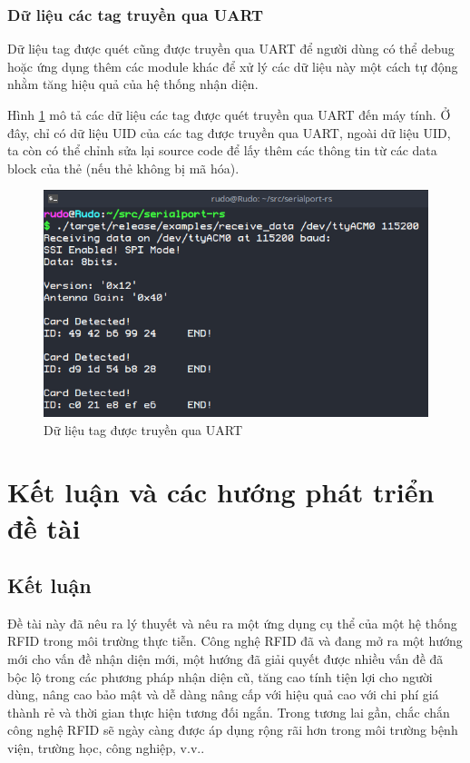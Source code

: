 \subsection{Dữ liệu các tag truyền qua UART}
Dữ liệu tag được quét cũng được truyền qua UART để người dùng có thể debug hoặc ứng dụng thêm các module khác để xử lý các dữ liệu này một cách tự động nhằm tăng hiệu quả của hệ thống nhận diện.

Hình \ref{fig:UART_data_receive} mô tả các dữ liệu các tag được quét truyền qua UART đến máy tính.
Ở đây, chỉ có dữ liệu UID của các tag được truyền qua UART, ngoài dữ liệu UID, ta còn có thể chỉnh sửa lại source code để lấy thêm các thông tin từ các data block của thẻ (nếu thẻ không bị mã hóa).
\begin{figure}[ht]
\centering
\includegraphics[scale=0.8]{images/UART_data_receive.png}
\caption{Dữ liệu tag được truyền qua UART}
\label{fig:UART_data_receive}
\end{figure}

\chapter{Kết luận và các hướng phát triển đề tài}
\section{Kết luận}
Đề tài này đã nêu ra lý thuyết và nêu ra một ứng dụng cụ thể của một hệ thống RFID trong môi trường thực tiễn.
Công nghệ RFID đã và đang mở ra một hướng mới cho vấn đề nhận diện mới, một hướng đã giải quyết được nhiều vấn đề đã bộc lộ trong các phương pháp nhận diện cũ,
tăng cao tính tiện lợi cho người dùng, nâng cao bảo mật và dễ dàng nâng cấp với hiệu quả cao với chi phí giá thành rẻ và thời gian thực hiện tương đối ngắn.
Trong tương lai gần, chắc chắn công nghệ RFID sẽ ngày càng được áp dụng rộng rãi hơn trong môi trường bệnh viện, trường học, công nghiệp, v.v..
